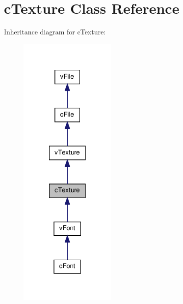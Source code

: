 \hypertarget{classc_texture}{
\section{cTexture Class Reference}
\label{classc_texture}
}


Inheritance diagram for cTexture:
\nopagebreak
\begin{figure}[H]
\begin{center}
\leavevmode
\includegraphics[width=134pt]{classc_texture__inherit__graph}
\end{center}
\end{figure}



